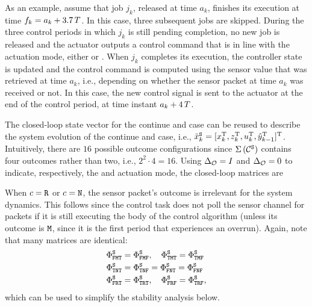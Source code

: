 As an example, assume that job $j_k$, released at time $a_k$, finishes its execution at time $f_k = a_k + 3.7\,T$.
In this case, three subsequent jobs are skipped.
During the three control periods in which $j_k$ is still pending completion, no new job is released and the actuator outputs a control command that is in line with the actuation mode, either \tH{} or \tZ{}.
When $j_k$ completes its execution, the controller state is updated and the control command is computed using the sensor value that was retrieved at time $a_k$, i.e., depending on whether the sensor packet at time $a_k$ was received or not.
In this case, the new control signal is sent to the actuator at the end of the control period, at time instant $a_k+4\,T$.

The closed-loop state vector for the continue and \tK{} case can be reused to describe the system evolution of the continue and \tS{} case, i.e., $\tilde x_k^{\texttt{S}} = [ x_k^{\mathrm{\small{T}}}{}, z_k^{\mathrm{\small{T}}}{}, u_k^{\mathrm{\small{T}}}{}, \hat y_{k-1}^{\mathrm{\small{T}}}{} ]^{\mathrm{\small{T}}}{}$.
Intuitively, there are $16$ possible outcome configurations since $\Sigma\,({\mathcal{C}^{\texttt{S}}}){}$ contains four outcomes rather than two, i.e., $2^2\cdot 4=16$.
Using $\Delta_{\mathcal{O}} = I$ and $\Delta_{\mathcal{O}} = 0$ to indicate, respectively, the \tH{} and \tZ{} actuation mode, the closed-loop matrices are
%

When $c=\texttt{R}$ or $c=\texttt{N}$, the sensor packet's outcome is irrelevant for the system dynamics.
This follows since the control task does not poll the sensor channel for packets if it is still executing the body of the control algorithm (unless its outcome is $\texttt{M}$, since it is the first period that experiences an overrun).
Again, note that many matrices are identical:
\begin{align*}
    \Phi^{\texttt{S}}_{\texttt{F}\texttt{M}\texttt{T}} &= \Phi^{\texttt{S}}_{\texttt{F}\texttt{M}\texttt{F}},\quad \Phi^{\texttt{S}}_{\texttt{T}\texttt{M}\texttt{T}} = \Phi^{\texttt{S}}_{\texttt{T}\texttt{M}\texttt{F}} \\
    \Phi^{\texttt{S}}_{\texttt{T}\texttt{N}\texttt{T}} &= \Phi^{\texttt{S}}_{\texttt{T}\texttt{N}\texttt{F}} = \Phi^{\texttt{S}}_{\texttt{F}\texttt{N}\texttt{T}} = \Phi^{\texttt{S}}_{\texttt{F}\texttt{N}\texttt{F}} \\
    \Phi^{\texttt{S}}_{\texttt{F}\texttt{R}\texttt{T}} &= \Phi^{\texttt{S}}_{\texttt{T}\texttt{R}\texttt{T}},\quad \Phi^{\texttt{S}}_{\texttt{F}\texttt{R}\texttt{F}} = \Phi^{\texttt{S}}_{\texttt{T}\texttt{R}\texttt{F}},
\end{align*}
which can be used to simplify the stability analysis below.

